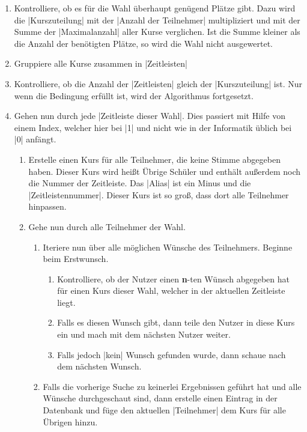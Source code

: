 \documentclass[ngerman]{ltxdoc}
\begin{document}
\begin{enumerate}
  \item Kontrolliere, ob es für die Wahl überhaupt genügend Plätze gibt. Dazu
  wird die |Kurszuteilung| mit der |Anzahl der Teilnehmer| multipliziert und mit
  der Summe der |Maximalanzahl| aller Kurse verglichen. Ist die Summe kleiner
  als die Anzahl der benötigten Plätze, so wird die Wahl nicht ausgewertet.
  \item Gruppiere alle Kurse zusammen in |Zeitleisten|
  \item Kontrolliere, ob die Anzahl der |Zeitleisten| gleich der |Kurszuteilung|
  ist. Nur wenn die Bedingung erfüllt ist, wird der Algorithmus fortgesetzt.
  \item Gehen nun durch jede |Zeitleiste dieser Wahl|. Dies passiert mit Hilfe von
  einem Index, welcher hier bei |1| und nicht wie in der Informatik üblich bei |0|
  anfängt.
  \begin{enumerate}
    \item Erstelle einen Kurs für alle Teilnehmer, die keine Stimme abgegeben
    haben. Dieser Kurs wird heißt \glqq Übrige Schüler\grqq{} und enthält außerdem
    noch die Nummer der Zeitleiste. Das |Alias| ist ein Minus und die |Zeitleistennummer|.
    Dieser Kurs ist so groß, dass dort alle Teilnehmer hinpassen.
    \item Gehe nun durch alle Teilnehmer der Wahl.
    \begin{enumerate}
      \item Iteriere nun über alle möglichen Wünsche des Teilnehmers. Beginne
      beim Erstwunsch.
      \begin{enumerate}
        \item Kontrolliere, ob der Nutzer einen \textbf{n}-ten Wünsch abgegeben hat
        für einen Kurs dieser Wahl, welcher in der aktuellen Zeitleiste liegt.
        \item Falls es diesen Wunsch gibt, dann teile den Nutzer in diese Kurs ein
        und mach mit dem nächsten Nutzer weiter.
        \item Falls jedoch |kein| Wunsch gefunden wurde, dann schaue nach dem nächsten
        Wunsch.
      \end{enumerate}
      \item Falls die vorherige Suche zu keinerlei Ergebnissen geführt hat und alle
      Wünsche durchgeschaut sind, dann erstelle einen Eintrag in der Datenbank und
      füge den aktuellen |Teilnehmer| dem Kurs für alle Übrigen hinzu.
    \end{enumerate}

\end{enumerate}
\end{enumerate}
\end{document}
